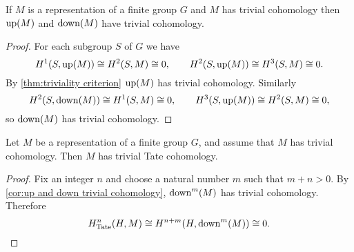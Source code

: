 \begin{corollary}	\label{cor:up and down trivial cohomology}
	If $M$ is a representation of a finite group $G$ and $M$ has trivial cohomology
	then $\mathrm{up}(M)$ and $\mathrm{down}(M)$ have trivial cohomology.
\end{corollary}

\begin{proof}
	For each subgroup $S$ of $G$ we have
	\[
		H^1(S,\mathrm{up}(M)) \cong H^2(S,M) \cong 0,
		\qquad
		H^2(S,\mathrm{up}(M)) \cong H^3(S,M) \cong 0.
	\]
	By \ref{thm:triviality criterion} $\mathrm{up}(M)$ has trivial cohomology.
	Similarly
	\[
		H^2(S,\mathrm{down}(M)) \cong H^1(S,M) \cong 0,
		\qquad
		H^3(S,\mathrm{up}(M)) \cong H^2(S,M) \cong 0,
	\]
	so $\mathrm{down}(M)$ has trivial cohomology.
\end{proof}

\begin{theorem}
	Let $M$ be a representation of a finite group $G$, and assume that $M$ has trivial cohomology.
	Then $M$ has trivial Tate cohomology.
\end{theorem}

\begin{proof}
	Fix an integer $n$ and choose a natural number $m$ such that $m + n > 0$.
	By \ref{cor:up and down trivial cohomology}, $\mathrm{down}^m(M)$ has trivial cohomology.
	Therefore
	\[
		H^n_{\mathrm{Tate}}(H,M) \cong H^{n+m}(H, \mathrm{down}^m(M)) \cong 0.
	\]
\end{proof}





